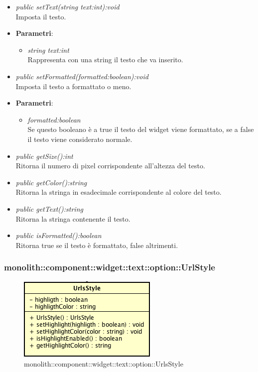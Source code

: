 \begin{itemize}
\begin{itemize}
{\begin{itemize}
		\end{itemize}}
	\item \textit{public setText(string text:int):void}\\
	Imposta il testo.
		\item{\textbf{Parametri}: \begin{itemize}
		\item \textit{string text:int}\\
		Rappresenta con una string il testo che va inserito.
		\end{itemize}}
	\item \textit{public setFormatted(formatted:boolean):void}\\
	Imposta il testo a formattato o meno.
		\item{\textbf{Parametri}: \begin{itemize}
		\item \textit{formatted:boolean}\\
		Se questo booleano è a true il testo del widget viene formattato, se a false il testo viene considerato normale.
		\end{itemize}}
	\item \textit{public getSize():int}\\
	Ritorna il numero di pixel corrispondente all'altezza del testo.
	\item \textit{public getColor():string}\\
	Ritorna  la stringa in esadecimale corrispondente al colore del testo.
	\item \textit{public getText():string}\\
	Ritorna la stringa contenente il testo.
	\item \textit{public isFormatted():boolean}\\
	Ritorna true se il testo è formattato, false altrimenti.
	\end{itemize}
\end{itemize}

\subsubsection{monolith::component::widget::text::option::UrlStyle}

\label{monolith::component::widget::text::option::UrlsStyle}
\begin{figure}[ht]
	\centering
	\includegraphics[scale=0.5]{Sezioni/SottosezioniST/img/UrlsStyle.png}
	\caption{monolith::component::widget::text::option::UrlsStyle}
\end{figure}

